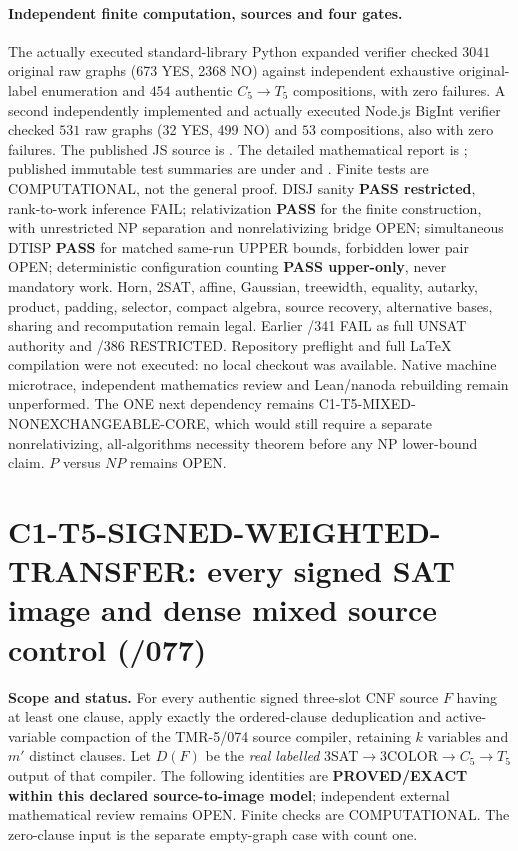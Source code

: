 \documentclass[11pt]{article}
\begin{document}
\paragraph{Independent finite computation, sources and four gates.}
The actually executed standard-library Python expanded verifier
checked $3041$ original raw graphs (673 YES, 2368 NO) against
independent exhaustive original-label enumeration and
$454$ authentic $C_5\to T_5$ compositions, with zero failures.
A second independently implemented and actually executed Node.js
BigInt verifier checked $531$ raw graphs (32 YES, 499 NO) and
$53$ compositions, also with zero failures. The published JS
source is
.
The detailed mathematical report is
;
published immutable test summaries are under
and
.
Finite tests are COMPUTATIONAL, not the general proof.
DISJ sanity \textbf{PASS restricted}, rank-to-work inference FAIL;
relativization \textbf{PASS} for the finite construction, with
unrestricted NP separation and nonrelativizing bridge OPEN;
simultaneous DTISP \textbf{PASS} for matched same-run UPPER bounds,
forbidden lower pair OPEN; deterministic configuration counting
\textbf{PASS upper-only}, never mandatory work.
Horn, 2SAT, affine, Gaussian, treewidth, equality, autarky, product,
padding, selector, compact algebra, source recovery, alternative
bases, sharing and recomputation remain legal.
Earlier /341 FAIL as full UNSAT authority and /386 RESTRICTED.
Repository preflight and full \LaTeX{} compilation were not executed:
no local checkout was available. Native machine microtrace,
independent mathematics review and Lean/nanoda rebuilding remain
unperformed. The ONE next dependency remains
C1-T5-MIXED-NONEXCHANGEABLE-CORE, which would still require
a separate nonrelativizing, all-algorithms necessity theorem
before any NP lower-bound claim. $P$ versus $NP$ remains OPEN.

\section{C1-T5-SIGNED-WEIGHTED-TRANSFER: every signed SAT image and dense mixed source control (/077)}
\noindent\textbf{Scope and status.}
For every authentic signed three-slot CNF source $F$ having at least
one clause, apply exactly the ordered-clause deduplication and
active-variable compaction of the TMR-5/074 source compiler,
retaining $k$ variables and $m'$ distinct clauses.
Let $D(F)$ be the \emph{real labelled}
$3$SAT$\to 3$COLOR$\to C_5\to T_5$ output of that compiler.
The following identities are \textbf{PROVED/EXACT within this
declared source-to-image model}; independent external mathematical
review remains OPEN. Finite checks are COMPUTATIONAL.
The zero-clause input is the separate empty-graph case with count one.
\end{document}
